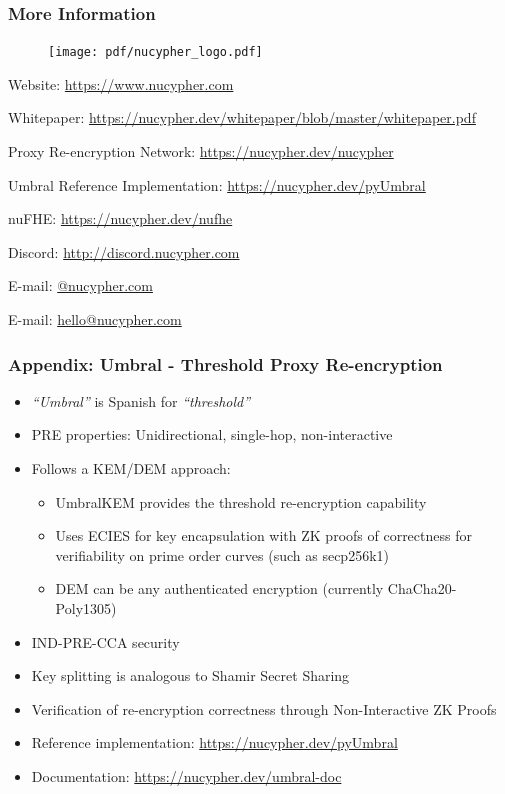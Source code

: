 \documentclass[xetex,mathsans,sans,aspectratio=169]{beamer}
\begin{document}
    \begin{frame}
        \frametitle{More Information}
        \begin{figure}
            \centering
            \texttt{[image: pdf/nucypher\_logo.pdf]}
        \end{figure}
        Website: \url{https://www.nucypher.com}

        Whitepaper: \url{https://nucypher.dev/whitepaper/blob/master/whitepaper.pdf}

        Proxy Re-encryption Network: \url{https://nucypher.dev/nucypher}

        Umbral Reference Implementation: \url{https://nucypher.dev/pyUmbral}

        nuFHE: \url{https://nucypher.dev/nufhe}

        Discord: \url{http://discord.nucypher.com}

        E-mail: \href{mailto:\emailname @nucypher.com}{\emailname @nucypher.com}

        E-mail: \href{mailto:hello@nucypher.com}{hello@nucypher.com}
    \end{frame}

    \begin{frame}
        \frametitle{Appendix: Umbral - Threshold Proxy Re-encryption}
        \begin{itemize}
        	\item \emph{``Umbral''} is Spanish for \emph{``threshold''}
            \item PRE properties: Unidirectional, single-hop, non-interactive
            \item Follows a KEM/DEM approach:
            	\begin{itemize}
		    \item UmbralKEM provides the threshold re-encryption capability
                    \item Uses ECIES for key encapsulation with ZK proofs of correctness for verifiability on prime order curves (such as secp256k1)
            	    \item DEM can be any authenticated encryption (currently ChaCha20-Poly1305)
        	\end{itemize}
	    \item IND-PRE-CCA security
            \item Key splitting is analogous to Shamir Secret Sharing
	    \item Verification of re-encryption correctness through Non-Interactive ZK Proofs
            \item Reference implementation: \url{https://nucypher.dev/pyUmbral}
	        \item Documentation: \url{https://nucypher.dev/umbral-doc}
        \end{itemize}
    \end{frame}
\end{document}
